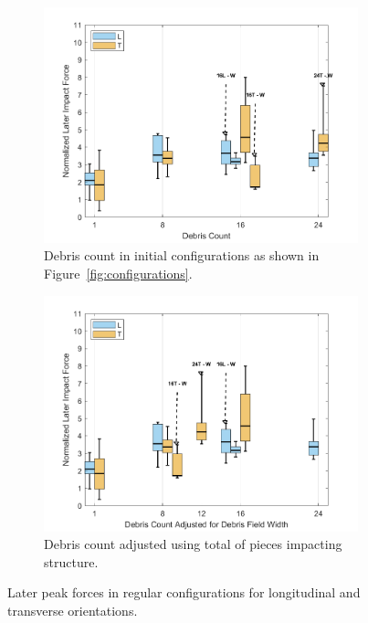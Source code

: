 \documentclass{article}
\begin{document}
{\begin{figure}[htbp]
    \centering
    \begin{subfigure}[t]{0.9\textwidth}
        \centering
        \includegraphics[width=\textwidth]{LaterPeak_Regular_SplitByTrial.png}
        \caption{Debris count in initial configurations as shown in Figure~\ref{fig:configurations}.}
        \label{fig:laterpeak_regular_original}
    \end{subfigure}
    \hfill
    \begin{subfigure}[t]{0.9\textwidth}
        \centering
        \includegraphics[width=\textwidth]{LaterPeak_Regular_RemappedT.png}
        \caption{Debris count adjusted using total of pieces impacting structure.}
        \label{fig:laterpeak_regular_remap}
    \end{subfigure}
    \caption{Later peak forces  in regular configurations for longitudinal and transverse orientations.}
    \label{fig:laterpeak_regular_split}
\end{figure}

}
\end{document}
